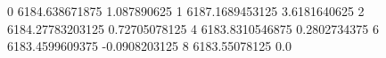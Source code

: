 0 6184.638671875 1.087890625
1 6187.1689453125 3.6181640625
2 6184.27783203125 0.72705078125
4 6183.8310546875 0.2802734375
6 6183.4599609375 -0.0908203125
8 6183.55078125 0.0
